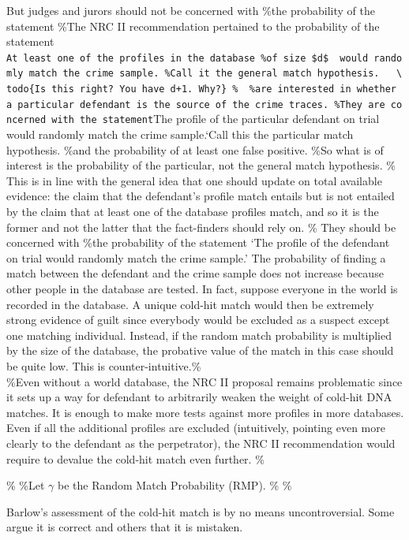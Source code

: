 \documentclass[10pt,dvipsnames,enabledeprecatedfontcommands]{scrartcl}
\begin{document}
But judges and jurors should not be concerned with \%the probability of
the statement \%The NRC II recommendation pertained to the probability
of the statement
\texttt{At\ least\ one\ of\ the\ profiles\ in\ the\ database\ \%of\ size\ \$d\$\ \ would\ randomly\ match\ the\ crime\ sample.\textquotesingle{}\ \%Call\ it\ the\ general\ match\ hypothesis.\ \ \ \textbackslash{}todo\{Is\ this\ right?\ You\ have\ d+1.\ Why?\}\ \%\ \ \%are\ interested\ in\ whether\ a\ particular\ defendant\ is\ the\ source\ of\ the\ crime\ traces.\ \%They\ are\ concerned\ with\ the\ statement}The
profile of the particular defendant on trial would randomly match the
crime sample.`Call this the particular match hypothesis. \%and the
probability of at least one false positive. \%So what is of interest is
the probability of the particular, not the general match hypothesis. \%
This is in line with the general idea that one should update on total
available evidence: the claim that the defendant's profile match entails
but is not entailed by the claim that at least one of the database
profiles match, and so it is the former and not the latter that the
fact-finders should rely on. \% They should be concerned with \%the
probability of the statement `The profile of the defendant on trial
would randomly match the crime sample.' The probability of finding a
match between the defendant and the crime sample does not increase
because other people in the database are tested. In fact, suppose
everyone in the world is recorded in the database. A unique cold-hit
match would then be extremely strong evidence of guilt since everybody
would be excluded as a suspect except one matching individual. Instead,
if the random match probability is multiplied by the size of the
database, the probative value of the match in this case should be quite
low. This is counter-intuitive.\%\\
\%Even without a world database, the NRC II proposal remains problematic
since it sets up a way for defendant to arbitrarily weaken the weight of
cold-hit DNA matches. It is enough to make more tests against more
profiles in more databases. Even if all the additional profiles are
excluded (intuitively, pointing even more clearly to the defendant as
the perpetrator), the NRC II recommendation would require to devalue the
cold-hit match even further. \%

\% \%Let \(\gamma\) be the Random Match Probability (RMP). \% \%

Barlow's assessment of the cold-hit match is by no means
uncontroversial. Some argue it is correct and others that it is
mistaken.
\end{document}
